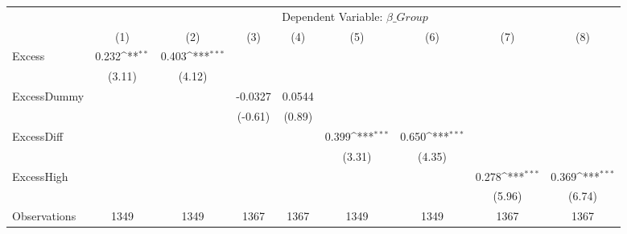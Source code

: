 {
\def\sym#1{\ifmmode^{#1}\else\(^{#1}\)\fi}
\begin{tabular}{l*{8}{c}}
\hline\hline
                &\multicolumn{8}{c}{Dependent Variable: $ \beta\_{Group} $ }                                                                                             \\\cmidrule(lr){2-9}
                &\multicolumn{1}{c}{(1)}         &\multicolumn{1}{c}{(2)}         &\multicolumn{1}{c}{(3)}         &\multicolumn{1}{c}{(4)}         &\multicolumn{1}{c}{(5)}         &\multicolumn{1}{c}{(6)}         &\multicolumn{1}{c}{(7)}         &\multicolumn{1}{c}{(8)}         \\
\hline
Excess          &    0.232\sym{**} &    0.403\sym{***}&                  &                  &                  &                  &                  &                  \\
                &   (3.11)         &   (4.12)         &                  &                  &                  &                  &                  &                  \\
[1em]
ExcessDummy     &                  &                  &  -0.0327         &   0.0544         &                  &                  &                  &                  \\
                &                  &                  &  (-0.61)         &   (0.89)         &                  &                  &                  &                  \\
[1em]
ExcessDiff      &                  &                  &                  &                  &    0.399\sym{***}&    0.650\sym{***}&                  &                  \\
                &                  &                  &                  &                  &   (3.31)         &   (4.35)         &                  &                  \\
[1em]
ExcessHigh      &                  &                  &                  &                  &                  &                  &    0.278\sym{***}&    0.369\sym{***}\\
                &                  &                  &                  &                  &                  &                  &   (5.96)         &   (6.74)         \\
\hline
Observations    &     1349         &     1349         &     1367         &     1367         &     1349         &     1349         &     1367         &     1367         \\

\end{tabular}}
